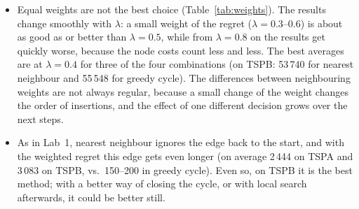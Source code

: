 \documentclass[11pt,a4paper]{article}
\begin{document}
\begin{itemize}
        shorter (17\,016 vs.\ 17\,935).
  \item Equal weights are not the best choice (Table~\ref{tab:weights}). The
        results change smoothly with $\lambda$: a small weight of the regret
        ($\lambda = 0.3$--$0.6$) is about as good as or better than
        $\lambda = 0.5$, while from $\lambda = 0.8$ on the results get quickly
        worse, because the node costs count less and less. The best averages
        are at $\lambda = 0.4$ for three of the four combinations (on TSPB:
        53\,740 for nearest neighbour and 55\,548 for greedy cycle). The
        differences between neighbouring weights are not always regular,
        because a small change of the weight changes the order of insertions,
        and the effect of one different decision grows over the next steps.
  \item As in Lab~1, nearest neighbour ignores the edge back to the start, and
        with the weighted regret this edge gets even longer (on average 2\,444
        on TSPA and 3\,083 on TSPB, vs.\ 150--200 in greedy cycle). Even so,
        on TSPB it is the best method; with a better way of closing the cycle,
        or with local search afterwards, it could be better still.
\end{itemize}
\end{document}
